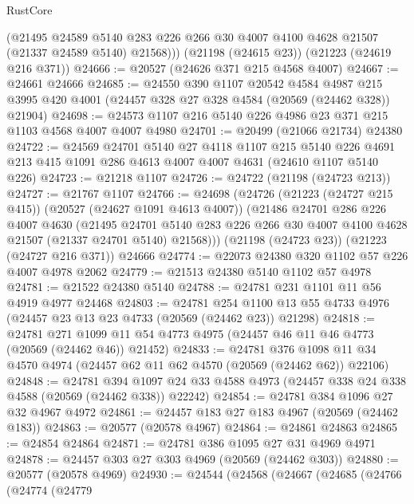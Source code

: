 \begin{lexlean}{RustCore}
\begin{coremodule}
        (@21495
          @24589
          @5140
          @283
          @226
          @266
          @30
          @4007
          @4100
          @4628
          @21507
          (@21337 @24589 @5140)
          @21568)))
    (@21198 (@24615 @23))
    (@21223 (@24619 @216 @371))
@24666 := @20527 (@24626 @371 @215 @4568 @4007)
@24667 := @24661 @24666
@24685 := @24550
    @390
    @1107
    @20542
    @4584
    @4987
    @215
    @3995
    @420
    @4001
    (@24457 @328 @27 @328 @4584 (@20569 (@24462 @328)) @21904)
@24698 := @24573 @1107 @216 @5140 @226 @4986 @23 @371 @215 @1103 @4568 @4007 @4007 @4980
@24701 := @20499 (@21066 @21734) @24380
@24722 := @24569
    @24701
    @5140
    @27
    @4118
    @1107
    @215
    @5140
    @226
    @4691
    @213
    @415
    @1091
    @286
    @4613
    @4007
    @4007
    @4631
    (@24610 @1107 @5140 @226)
@24723 := @21218 @1107
@24726 := @24722 (@21198 (@24723 @213))
@24727 := @21767 @1107
@24766 := @24698
    (@24726
      (@21223 (@24727 @215 @415))
      (@20527 (@24627 @1091 @4613 @4007))
      (@21486
        @24701
        @286
        @226
        @4007
        @4630
        (@21495
          @24701
          @5140
          @283
          @226
          @266
          @30
          @4007
          @4100
          @4628
          @21507
          (@21337 @24701 @5140)
          @21568)))
    (@21198 (@24723 @23))
    (@21223 (@24727 @216 @371))
    @24666
@24774 := @22073 @24380 @320 @1102 @57 @226 @4007 @4978 @2062
@24779 := @21513 @24380 @5140 @1102 @57 @4978
@24781 := @21522 @24380 @5140
@24788 := @24781 @231 @1101 @11 @56 @4919 @4977 @24468
@24803 := @24781
    @254
    @1100
    @13
    @55
    @4733
    @4976
    (@24457 @23 @13 @23 @4733 (@20569 (@24462 @23)) @21298)
@24818 := @24781
    @271
    @1099
    @11
    @54
    @4773
    @4975
    (@24457 @46 @11 @46 @4773 (@20569 (@24462 @46)) @21452)
@24833 := @24781
    @376
    @1098
    @11
    @34
    @4570
    @4974
    (@24457 @62 @11 @62 @4570 (@20569 (@24462 @62)) @22106)
@24848 := @24781
    @394
    @1097
    @24
    @33
    @4588
    @4973
    (@24457 @338 @24 @338 @4588 (@20569 (@24462 @338)) @22242)
@24854 := @24781 @384 @1096 @27 @32 @4967 @4972
@24861 := @24457 @183 @27 @183 @4967 (@20569 (@24462 @183))
@24863 := @20577 (@20578 @4967)
@24864 := @24861 @24863
@24865 := @24854 @24864
@24871 := @24781 @386 @1095 @27 @31 @4969 @4971
@24878 := @24457 @303 @27 @303 @4969 (@20569 (@24462 @303))
@24880 := @20577 (@20578 @4969)
@24930 := @24544
    (@24568
      (@24667
        (@24685
          (@24766
            (@24774
              (@24779

\end{coremodule}
\end{lexlean}
